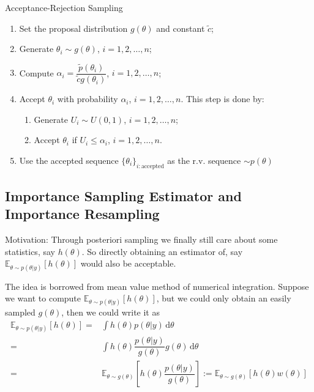 \begin{algorithm}{Acceptance-Rejection Sampling}
    \begin{enumerate}[topsep=2pt,itemsep=0pt]
        \item Set the proposal distribution $ g(\theta ) $ and constant $ \tilde{c} $;
        \item Generate $ \theta _i\sim g(\theta ) $, $ i=1,2,\ldots,n $;
        \item Compute $ \alpha _i=\dfrac{ \tilde{p}(\theta _i) }{ \tilde{c}g(\theta _i) }  $, $ i=1,2,\ldots,n $;
        \item Accept $ \theta _i $ with probability $ \alpha _i $, $ i=1,2,\ldots,n $. This step is done by:
        \begin{enumerate}[topsep=2pt,itemsep=2pt]
            \item Generate $ U_i\sim U(0,1) $, $ i=1,2,\ldots,n $;
            \item Accept $ \theta _i $ if $ U_i\leqslant \alpha _i $, $ i=1,2,\ldots,n $.
        \end{enumerate}
        \item Use the accepted sequence $ \{\theta _i\}_{i:\text{accepted}} $ as the r.v. sequence $ \sim p(\theta ) $
    \end{enumerate}
\end{algorithm}
    

\subsection{Importance Sampling Estimator and Importance Resampling}
Motivation: Through posteriori sampling we finally still care about some statistics, say $ h(\theta ) $. So directly obtaining an estimator of, say $ \mathbb{E}_{\theta \sim p(\theta |y)}\left[ h(\theta ) \right]  $ would also be acceptable. 

The idea is borrowed from mean value method of numerical integration. Suppose we want to compute $ \mathbb{E}_{\theta \sim p(\theta |y)}\left[ h(\theta ) \right]  $, but we could only obtain an easily sampled $ g(\theta ) $, then we could write it as 
\begin{align}
    \mathbb{E}_{\theta \sim p(\theta |y)}\left[ h(\theta ) \right] = & \int h(\theta )p(\theta |y)\,\mathrm{d}\theta  \\
    =& \int h(\theta )\dfrac{ p(\theta |y) }{ g(\theta ) } g(\theta )\,\mathrm{d}\theta  \\
    =& \mathbb{E}_{\theta \sim g(\theta )}\left[ h(\theta )\dfrac{ p(\theta |y) }{ g(\theta ) }  \right] := \mathbb{E}_{\theta \sim g(\theta )}\left[ h(\theta )w(\theta )   \right]
\end{align}

